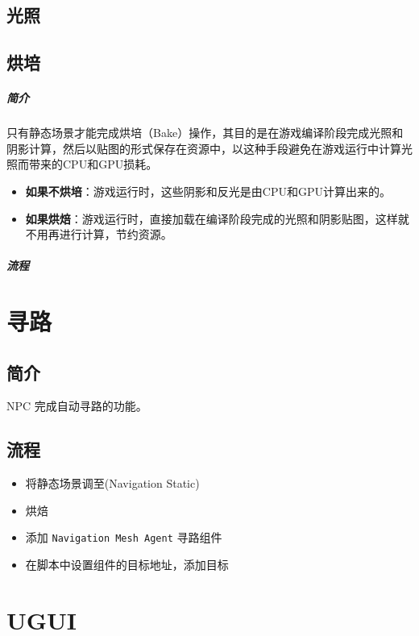 \documentclass[UTF8,a4paper,12pt]{ctexbook}
\begin{document}
	\section{光照}
		
	\section{烘培}
		\paragraph{简介}
			只有静态场景才能完成烘培（Bake）操作，其目的是在游戏编译阶段完成光照和阴影计算，然后以贴图的形式保存在资源中，以这种手段避免在游戏运行中计算光照而带来的CPU和GPU损耗。
			
			\begin{itemize}
				\item \textbf{如果不烘培}：游戏运行时，这些阴影和反光是由CPU和GPU计算出来的。
				\item \textbf{如果烘焙}：游戏运行时，直接加载在编译阶段完成的光照和阴影贴图，这样就不用再进行计算，节约资源。
			\end{itemize}
		
		\paragraph{流程}
	
	
\chapter{寻路}
	\section{简介}
		NPC 完成自动寻路的功能。
		
	\section{流程}
		\begin{itemize}
			\item 将静态场景调至(Navigation Static)
			\item 烘焙
			\item 添加 \verb|Navigation Mesh Agent| 寻路组件
			\item 在脚本中设置组件的目标地址，添加目标
		\end{itemize}
	
\chapter{UGUI}
\end{document}
